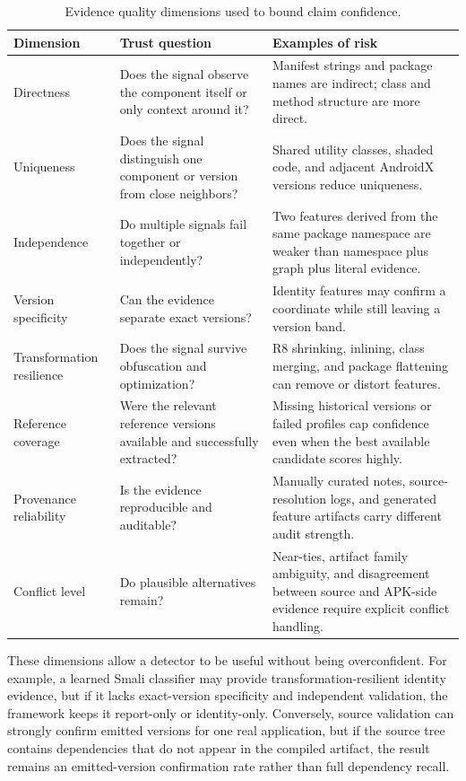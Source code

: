 \begin{table}[H]
\centering
\small
\caption{Evidence quality dimensions used to bound claim confidence.}
\label{tab:master-quality-dimensions}
\begin{tabularx}{\textwidth}{>{\raggedright\arraybackslash}p{}>{\raggedright\arraybackslash}p{}X}
\toprule
\textbf{Dimension} & \textbf{Trust question} & \textbf{Examples of risk}\\
\midrule
Directness & Does the signal observe the component itself or only context
around it? & Manifest strings and package names are indirect; class and method
structure are more direct.\\
Uniqueness & Does the signal distinguish one component or version from close
neighbors? & Shared utility classes, shaded code, and adjacent AndroidX
versions reduce uniqueness.\\
Independence & Do multiple signals fail together or independently? & Two
features derived from the same package namespace are weaker than namespace
plus graph plus literal evidence.\\
Version specificity & Can the evidence separate exact versions? & Identity
features may confirm a coordinate while still leaving a version band.\\
Transformation resilience & Does the signal survive obfuscation and
optimization? & R8 shrinking, inlining, class merging, and package flattening
can remove or distort features.\\
Reference coverage & Were the relevant reference versions available and
successfully extracted? & Missing historical versions or failed profiles cap
confidence even when the best available candidate scores highly.\\
Provenance reliability & Is the evidence reproducible and auditable? &
Manually curated notes, source-resolution logs, and generated feature
artifacts carry different audit strength.\\
Conflict level & Do plausible alternatives remain? & Near-ties, artifact
family ambiguity, and disagreement between source and APK-side evidence require
explicit conflict handling.\\
\bottomrule
\end{tabularx}
\end{table}

These dimensions allow a detector to be useful without being overconfident.
For example, a learned Smali classifier may provide transformation-resilient
identity evidence, but if it lacks exact-version specificity and independent
validation, the framework keeps it report-only or identity-only. Conversely,
source validation can strongly confirm emitted versions for one real
application, but if the source tree contains dependencies that do not appear in
the compiled artifact, the result remains an emitted-version confirmation
rate rather than full dependency recall.

